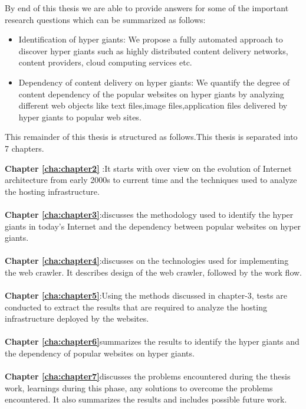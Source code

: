 By end of this thesis we are able to provide answers for some of the important research questions which can be summarized as follows:

\begin{itemize}
\item Identification of hyper giants: We propose a fully automated approach to discover hyper giants such as highly distributed content delivery networks, content providers, cloud computing services etc.

\item Dependency of content delivery on hyper giants: We quantify the degree of content dependency
of the popular websites on hyper giants by analyzing different web objects like text files,image files,application files delivered by hyper giants to popular web sites.
\end{itemize}

This remainder of this thesis is structured as follows.This thesis is separated
into 7 chapters.

\textbf{Chapter \ref{cha:chapter2}} :It starts with over view on the evolution of Internet architecture from early 2000s to current time and the techniques used to analyze the hosting infrastructure.
\\
\\
\textbf{Chapter \ref{cha:chapter3}}:discusses the methodology used to identify the hyper giants in today's Internet and the dependency between popular websites on hyper giants.
\\
\\
\textbf{Chapter \ref{cha:chapter4}}:discusses on the technologies used for implementing the web crawler. It describes design of the web crawler, followed by the work flow. 
\\
\\
\textbf{Chapter \ref{cha:chapter5}}:Using the methods discussed in chapter-3, tests are conducted to extract the results that are required to analyze the hosting infrastructure deployed by the websites. 
\\
\\
\textbf{Chapter \ref{cha:chapter6}}summarizes the results to identify the hyper giants and the dependency of popular websites on hyper giants.
\\
\\
\textbf{Chapter \ref{cha:chapter7}}discusses the problems encountered during the thesis work, learnings during this phase, any solutions to overcome the problems encountered. It also summarizes the results and includes possible future work. 
\\
\\
